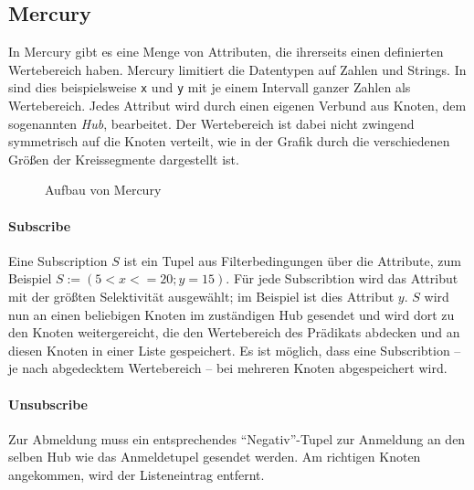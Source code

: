 \subsection{Mercury}
\label{chap:related:mercury}
In Mercury \cite{Bharambe2004Mercury} gibt es eine Menge von Attributen, die ihrerseits einen definierten Wertebereich haben. Mercury limitiert die Datentypen auf Zahlen und Strings. In  sind dies beispielsweise \texttt{x} und \texttt{y} mit je einem Intervall ganzer Zahlen als Wertebereich. Jedes Attribut wird durch einen eigenen Verbund aus Knoten, dem sogenannten \emph{Hub}, bearbeitet. Der Wertebereich ist dabei nicht zwingend symmetrisch auf die Knoten verteilt, wie in der Grafik durch die verschiedenen Größen der Kreissegmente dargestellt ist. 

\begin{figure}[htbp]
\centering
{}
\caption{Aufbau von Mercury}
\label{fig:mercury}
\end{figure}

\paragraph{Subscribe}
Eine Subscription $S$ ist ein Tupel aus Filterbedingungen über die Attribute, zum Beispiel $S := (5 < x <= 20; y = 15)$. Für jede Subscribtion wird das Attribut mit der größten Selektivität ausgewählt; im Beispiel ist dies Attribut $y$. $S$ wird nun an einen beliebigen Knoten im zuständigen Hub gesendet und wird dort zu den Knoten weitergereicht, die den Wertebereich des Prädikats abdecken und an diesen Knoten in einer Liste gespeichert. Es ist möglich, dass eine Subscribtion -- je nach abgedecktem Wertebereich -- bei mehreren Knoten abgespeichert wird.

\paragraph{Unsubscribe}
Zur Abmeldung muss ein entsprechendes \enquote{Negativ}-Tupel zur Anmeldung an den selben Hub wie das Anmeldetupel gesendet werden. Am richtigen Knoten angekommen, wird der Listeneintrag entfernt.


